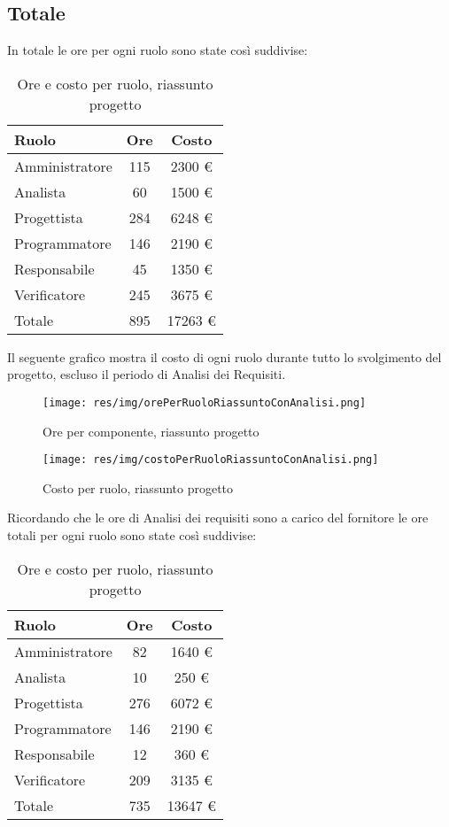 \subsection{Totale}
In totale le ore per ogni ruolo sono state così suddivise:

\begin{table}[H]
	\centering
	\begin{tabular}{ l c c }
		\textbf{Ruolo} & \textbf{Ore} & \textbf{Costo} \\
		\hline
		Amministratore & 115 & 2300 \euro \\
		Analista & 60 & 1500 \euro \\
		Progettista & 284 & 6248 \euro \\
		Programmatore & 146 & 2190 \euro \\
		Responsabile & 45 & 1350 \euro \\
		Verificatore & 245 & 3675 \euro \\
		\hline
		Totale & 895 & 17263 \euro \\
		\hline
	\end{tabular}
	\caption{Ore e costo per ruolo, riassunto progetto}
\end{table}

Il seguente grafico mostra il costo di ogni ruolo durante tutto lo svolgimento del progetto, escluso il periodo di Analisi dei Requisiti.

\begin{figure}[H]
  \begin{center}
    \texttt{[image: res/img/orePerRuoloRiassuntoConAnalisi.png]}
  \caption{Ore per componente, riassunto progetto}
  \end{center} 
\end{figure}  

\begin{figure}[H]
  \begin{center}
    \texttt{[image: res/img/costoPerRuoloRiassuntoConAnalisi.png]}
  \caption{Costo per ruolo, riassunto progetto}
  \end{center} 
\end{figure}  


Ricordando che le ore di Analisi dei requisiti sono a carico del fornitore le ore totali per ogni ruolo sono state così suddivise:
\begin{table}[H]
	\centering
	\begin{tabular}{ l c c }
		\textbf{Ruolo} & \textbf{Ore} & \textbf{Costo} \\
		\hline
		Amministratore & 82 & 1640 \euro \\
		Analista & 10 & 250 \euro \\
		Progettista & 276 & 6072 \euro \\
		Programmatore & 146 & 2190 \euro \\
		Responsabile & 12 & 360 \euro \\
		Verificatore & 209 & 3135 \euro \\
		\hline
		Totale & 735 & 13647 \euro \\
		\hline
	\end{tabular}
	\caption{Ore e costo per ruolo, riassunto progetto}
\end{table}

